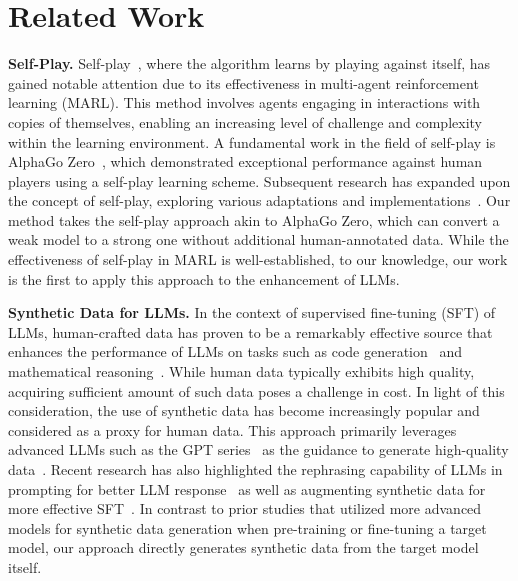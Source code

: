 \documentclass{article}
\begin{document}
\section{Related Work}
\noindent \textbf{Self-Play.} 
Self-play~\citep{samuel1959some,tesauro1995temporal}, where the algorithm learns by playing against itself, has gained notable attention due to its effectiveness in multi-agent reinforcement learning (MARL). 
This method involves agents engaging in interactions with copies of themselves, enabling an increasing level of challenge and complexity within the learning environment. 
A fundamental work in the field of self-play is AlphaGo Zero~\citep{silver2017mastering}, which demonstrated exceptional performance against human players using a self-play learning scheme. 
Subsequent research has expanded upon the concept of self-play, exploring various adaptations and implementations~\citep{anthony2017thinking,lanctot2017unified,bansal2018emergent,hernandez2018multiagent,muller2019generalized,alphastarblog}.  
Our method takes the self-play approach akin to AlphaGo Zero, which can convert a weak model to a strong one without additional human-annotated data.
While the effectiveness of self-play in MARL is well-established, to our knowledge, our work is the first to apply this approach to the enhancement of LLMs. 

\noindent \textbf{Synthetic Data for LLMs.} 
In the context of supervised fine-tuning (SFT) of LLMs, human-crafted data has proven to be a remarkably effective source that enhances the performance of LLMs on tasks such as code generation~\citep{roziere2023code,yang2023decoding} and mathematical reasoning~\citep{yuan2023scaling,luo2023wizardmath}. 
While human data typically exhibits high quality, acquiring sufficient amount of such data poses a challenge in cost. 
In light of  this consideration, the use of synthetic data has become increasingly popular and considered as a proxy for human data. 
This approach primarily leverages advanced LLMs such as the GPT series~\citep{radford2019language,brown2020language,openai2023gpt4} as the guidance to generate high-quality data~\citep{josifoski2023exploiting,alpaca,vicuna2023,li2023textbooks}. 
Recent research has also highlighted the rephrasing capability of LLMs in prompting for better LLM response~\citep{deng2023rephrase,prasad2023rephrase} as well as augmenting synthetic data for more effective SFT~\citep{yu2023metamath,liu2023tinygsm}. 
In contrast to prior studies that utilized more advanced models for synthetic data generation when pre-training or fine-tuning a target model, our approach directly generates synthetic data from the target model itself. 
\end{document}
